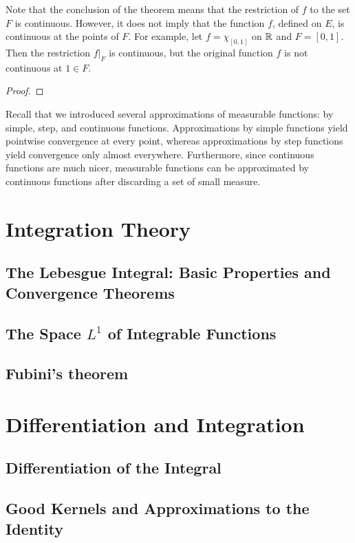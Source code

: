 \documentclass[12pt, a4paper, openany, twoside]{book}
\theoremstyle{definition}
\theoremstyle{remark}
\theoremstyle{plain}
\numberwithin{equation}{section}
\begin{document}
Note that the conclusion of the theorem means that the restriction of $f$ to the set $F$ is continuous. However, it does not imply that the function $f$, defined on $E$, is continuous at the points of $F$. For example, let $f=\chi_{[0,1]}$ on ${\mathbb {R}}$ and $F=[0,1]$. Then the restriction $f|_F$ is continuous, but the original function $f$ is not continuous at $1\in F$.

\vspace{5mm}
\begin{proof}
    
\end{proof}
\vspace{5mm}

Recall that we introduced several approximations of measurable functions: by simple, step, and continuous functions. Approximations by simple functions yield pointwise convergence at every point, whereas approximations by step functions yield convergence only almost everywhere. Furthermore, since continuous functions are much nicer, measurable functions can be approximated by continuous functions after discarding a set of small measure.


\newpage



\chapter{Integration Theory}
\section{The Lebesgue Integral: Basic Properties and Convergence Theorems}
\section{The Space $L^1$ of Integrable Functions}
\section{Fubini's theorem}

\newpage

\chapter{Differentiation and Integration}
\section{Differentiation of the Integral}
\section{Good Kernels and Approximations to the Identity}
\end{document}

